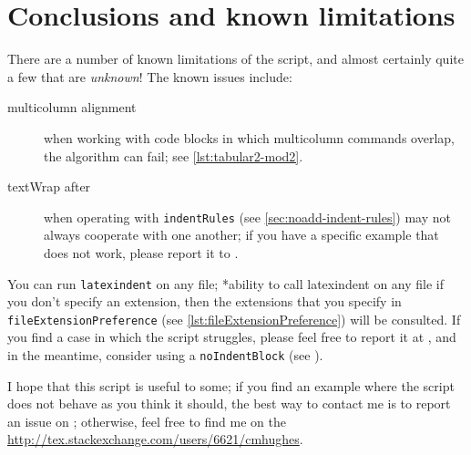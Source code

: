 \section{Conclusions and known limitations}\label{sec:knownlimitations}
 There are a number of known limitations of the script, and almost certainly quite a few
 that are \emph{unknown}! The known issues include:
 \begin{description}
  \item[multicolumn alignment] when working with code blocks in which multicolumn
        commands overlap, the algorithm can fail; see \vref{lst:tabular2-mod2}.
  \item[textWrap after] when operating with \texttt{indentRules} (see
        \vref{sec:noadd-indent-rules}) may not always cooperate with one another; if you
        have a specific example that does not work, please report it to
        \cite{latexindent-home}.
 \end{description}

 You can run \texttt{latexindent} on any file; *{ability to call
 latexindent on any file} if you don't specify an extension, then the extensions that you
 specify in \lstinline[breaklines=true]!fileExtensionPreference! (see
 \vref{lst:fileExtensionPreference}) will be consulted. If you find a case in which the
 script struggles, please feel free to report it at \cite{latexindent-home}, and in the
 meantime, consider using a \texttt{noIndentBlock} (see ).%

 I hope that this script is useful to some; if you find an example where the script does
 not behave as you think it should, the best way to contact me is to report an issue on
 \cite{latexindent-home}; otherwise, feel free to find me on the
 \url{http://tex.stackexchange.com/users/6621/cmhughes}.
